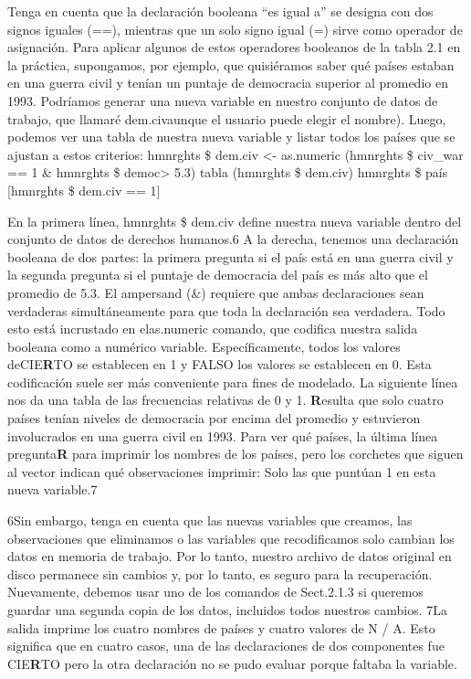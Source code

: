\documentclass[
]{book}
\begin{document}
Tenga en cuenta que la declaración booleana ``es igual a'' se designa con dos signos iguales (==), mientras que un solo signo igual (=) sirve como operador de asignación.
Para aplicar algunos de estos operadores booleanos de la tabla 2.1 en la práctica, supongamos, por ejemplo, que quisiéramos saber qué países estaban en una guerra civil y tenían un puntaje de democracia superior al promedio en 1993. Podríamos generar una nueva variable en nuestro conjunto de datos de trabajo, que llamaré dem.civaunque el usuario puede elegir el nombre). Luego, podemos ver una tabla de nuestra nueva variable y listar todos los países que se ajustan a estos criterios:
hmnrghts \$ dem.civ \textless- as.numeric (hmnrghts \$ civ\_war == 1 \& hmnrghts \$ democ\textgreater{} 5.3)
tabla (hmnrghts \$ dem.civ) hmnrghts \$ país {[}hmnrghts \$ dem.civ == 1{]}

En la primera línea, hmnrghts \$ dem.civ define nuestra nueva variable dentro del conjunto de datos de derechos humanos.6 A la derecha, tenemos una declaración booleana de dos partes: la primera pregunta si el país está en una guerra civil y la segunda pregunta si el puntaje de democracia del país es más alto que el promedio de 5.3. El ampersand (\&) requiere que ambas declaraciones sean verdaderas simultáneamente para que toda la declaración sea verdadera. Todo esto está incrustado en elas.numeric comando, que codifica nuestra salida booleana como a numérico variable.
Específicamente, todos los valores deCIE\textbf{R}TO se establecen en 1 y
FALSO los valores se establecen en 0. Esta codificación suele ser más conveniente para fines de modelado. La siguiente línea nos da una tabla de las frecuencias relativas de 0 y 1. \textbf{R}esulta que solo cuatro países tenían niveles de democracia por encima del promedio y estuvieron involucrados en una guerra civil en 1993. Para ver qué países, la última línea pregunta\textbf{R} para imprimir los nombres de los países, pero los corchetes que siguen al vector indican qué observaciones imprimir: Solo las que puntúan 1 en esta nueva variable.7

6Sin embargo, tenga en cuenta que las nuevas variables que creamos, las observaciones que eliminamos o las variables que recodificamos solo cambian los datos en memoria de trabajo. Por lo tanto, nuestro archivo de datos original en disco permanece sin cambios y, por lo tanto, es seguro para la recuperación. Nuevamente, debemos usar uno de los comandos de Sect.2.1.3 si queremos guardar una segunda copia de los datos, incluidos todos nuestros cambios.
7La salida imprime los cuatro nombres de países y cuatro valores de N / A. Esto significa que en cuatro casos, una de las declaraciones de dos componentes fue CIE\textbf{R}TO pero la otra declaración no se pudo evaluar porque faltaba la variable.
\end{document}
